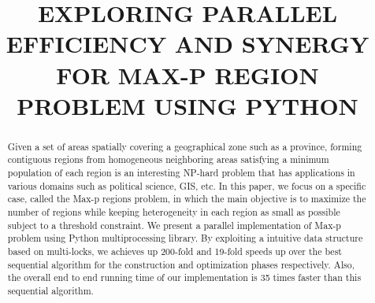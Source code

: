 \documentclass[conference]{IEEEtran}
\begin{document}
\pagestyle{plain}

\title{EXPLORING PARALLEL EFFICIENCY AND SYNERGY FOR MAX-P REGION PROBLEM USING PYTHON\\
}

\author{
\and
{}
\and
{}
\and
{}
}

\maketitle

\begin{abstract}
Given a set of areas spatially covering a geographical zone such as a
province, forming contiguous regions from homogeneous neighboring areas
satisfying a minimum population of each region is an interesting
NP-hard problem that has applications in various domains such as political
science, GIS, etc. In this paper, we focus on a specific case, called the Max-p
regions problem, in which the main objective is to maximize the number of regions while
keeping heterogeneity in each region as small as possible subject to a threshold
constraint.  We
present a parallel implementation of Max-p problem using Python multiprocessing
library. By exploiting a intuitive data structure based on multi-locks, we
achieves up 200-fold and 19-fold speeds up over the best sequential algorithm for
the construction and optimization phases respectively. Also, the overall end to
end running time of our implementation is 35 times faster than this sequential
algorithm.
\end{abstract}
\end{document}
